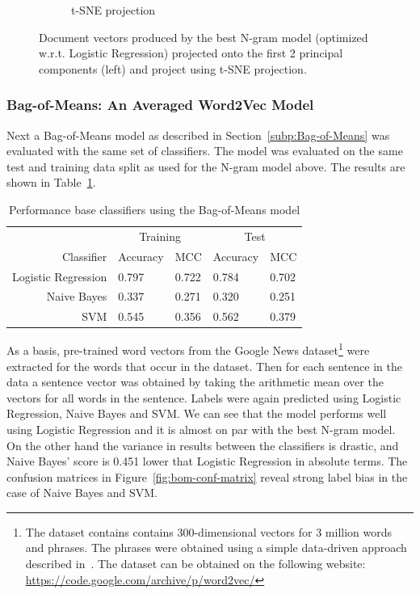 \begin{figure}[h]
\begin{subfigure}[b]{0.48\textwidth}
      \caption{t-SNE projection}
\label{fig:ngram-tsne}
    \end{subfigure}
    \caption{Document vectors produced by the best N-gram model (optimized w.r.t. Logistic Regression) projected onto the first 2 principal components (left) and project using t-SNE projection.}
\label{fig:ngram pca and tsne}
\end{figure}

\subsubsection{Bag-of-Means: An Averaged Word2Vec Model}
\label{subs:Bag-of-Means: An Averaged Word2Vec Model}

Next a Bag-of-Means model as described in Section~\ref{subp:Bag-of-Means} was evaluated with the same set of classifiers. The model was evaluated on the same test and training data split as used for the N-gram model above. The results are shown in Table~\ref{tab:Bag-Of-Means Results}.

\begin{table}[h]
  \begin{center}
  \begin{tabular}{ r | *2l | *2l }
    \toprule
     & \multicolumn{2}{c|}{Training} & \multicolumn{2}{|c}{Test}\\
    Classifier & Accuracy & MCC & Accuracy & MCC \\
    \midrule
    Logistic Regression & 0.797 & 0.722 & 0.784 & 0.702 \\
    Naive Bayes         & 0.337 & 0.271 & 0.320 & 0.251 \\
    SVM                 & 0.545 & 0.356 & 0.562 & 0.379 \\
    \bottomrule
  \end{tabular}
  \caption{Performance base classifiers using the Bag-of-Means model}
\label{tab:Bag-Of-Means Results}
\end{center}
\end{table}

As a basis, pre-trained word vectors from the Google News dataset\footnote{The dataset contains contains 300-dimensional vectors for 3 million words and phrases. The phrases were obtained using a simple data-driven approach described in~\cite{Mikolov:2013ab}. The dataset can be obtained on the following website: \url{https://code.google.com/archive/p/word2vec/}} were extracted for the words that occur in the dataset.
Then for each sentence in the data a sentence vector was obtained by taking the arithmetic mean over the vectors for all words in the sentence. Labels were again predicted using Logistic Regression, Naive Bayes and SVM.
We can see that the model performs well using Logistic Regression and it is almost on par with the best N-gram model. On the other hand the variance in results between the classifiers is drastic, and Naive Bayes' score is 0.451 lower that Logistic Regression in absolute terms. The confusion matrices in Figure~\ref{fig:bom-conf-matrix} reveal strong label bias in the case of Naive Bayes and SVM.

